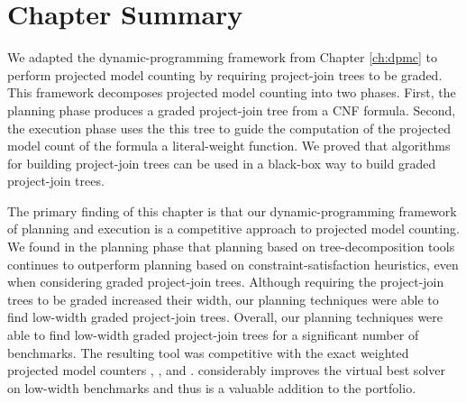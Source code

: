 \section{Chapter Summary}
\label{sec_procount_discussion}

We adapted the dynamic-programming framework from Chapter \ref{ch:dpmc} to perform projected model counting by requiring project-join trees to be graded.
This framework decomposes projected model counting into two phases.
First, the planning phase produces a graded project-join tree from a CNF formula.
Second, the execution phase uses the this tree to guide the computation of the projected model count of the formula \wrt{} a literal-weight function. 
We proved that algorithms for building project-join trees can be used in a black-box way to build graded project-join trees.

The primary finding of this chapter is that our dynamic-programming framework of planning and execution is a competitive approach to projected model counting.
We found in the planning phase that planning based on tree-decomposition tools continues to outperform planning based on constraint-satisfaction heuristics, even when considering graded project-join trees.
Although requiring the project-join trees to be graded increased their width, our planning techniques were able to find low-width graded project-join trees.
Overall, our planning techniques were able to find low-width graded project-join trees for a significant number of benchmarks.
The resulting tool \procount{} was competitive with the exact weighted projected model counters \dfp{} \cite{lagniez2019recursive}, \projmc{} \cite{lagniez2019recursive}, and \ssat{} \cite{lee2017solving}. 
\procount{} considerably improves the virtual best solver on low-width benchmarks and thus is a valuable addition to the portfolio.